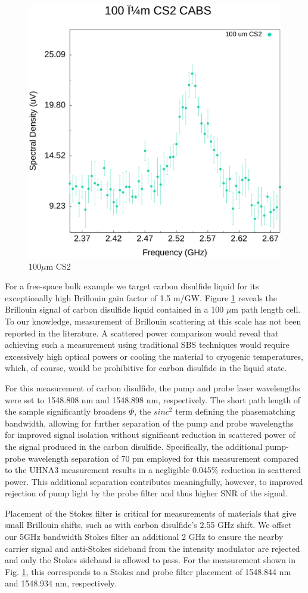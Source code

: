 \documentclass[%
  reprint,
  superscriptaddress,
  amsmath,amssymb,
  aps,
  prapplied,
]{revtex4-2}
\begin{document}
\begin{figure}[t]
  \centering
  \includegraphics[width=.45\textwidth]{100umCS2.pdf}
  \caption{100$\mu$m CS2}
  \label{fig:100umCS2}
\end{figure}

For a free-space bulk example we target carbon disulfide liquid for its exceptionally high Brillouin gain factor of 1.5 m/GW.\cite{boyd2020nonlinear} Figure \ref{fig:100umCS2} reveals the Brillouin signal of carbon disulfide liquid contained in a 100 $\mu$m path length cell. To our knowledge, measurement of Brillouin scattering at this scale has not been reported in the literature. A scattered power comparison would reveal that achieving such a measurement using traditional SBS techniques would require excessively high optical powers or cooling the material to cryogenic temperatures, which, of course, would be prohibitive for carbon disulfide in the liquid state.

For this measurement of carbon disulfide, the pump and probe laser wavelengths were set to 1548.808 nm and 1548.898 nm, respectively. The short path length of the sample significantly broadens $\Phi$, the $sinc^{2}$ term defining the phasematching bandwidth, allowing for further separation of the pump and probe wavelengths for improved signal isolation without significant reduction in scattered power of the signal produced in the carbon disulfide. Specifically, the additional pump-probe wavelength separation of 70 pm employed for this measurement compared to the UHNA3 measurement results in a negligible 0.045\% reduction in scattered power. This additional separation contributes meaningfully, however, to improved rejection of pump light by the probe filter and thus higher SNR of the signal.

Placement of the Stokes filter is critical for measurements of materials that give small Brillouin shifts, such as with carbon disulfide's 2.55 GHz shift. We offset our 5GHz bandwidth Stokes filter an additional 2 GHz to ensure the nearby carrier signal and anti-Stokes sideband from the intensity modulator are rejected and only the Stokes sideband is allowed to pass. For the measurement shown in Fig. \ref{fig:100umCS2}, this corresponds to a Stokes and probe filter placement of 1548.844 nm and 1548.934 nm, respectively.
\end{document}
